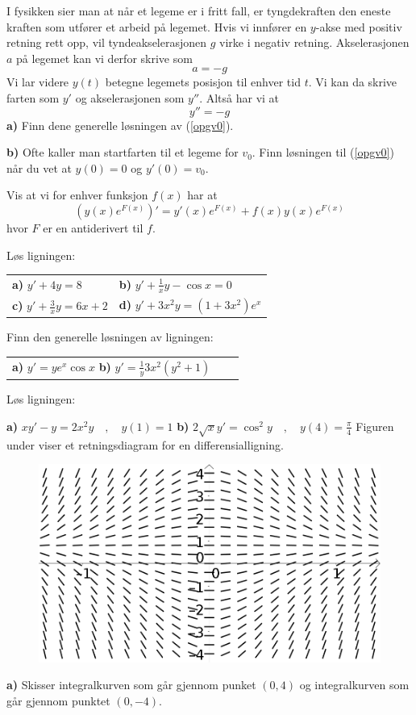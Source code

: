 



\eqlen
\opgt
\setcounter{section}{1}
I fysikken sier man at når et legeme er i fritt fall, er tyngdekraften den eneste kraften som utfører et arbeid på legemet. Hvis vi innfører en $ y $-akse med positiv retning rett opp, vil tyndeakselerasjonen $ g $ virke i negativ retning. Akselerasjonen $ a $ på legemet kan vi derfor skrive som
	\[ a = -g \]
	Vi lar videre $ y(t) $ betegne legemets posisjon til enhver tid $ t $. Vi kan da skrive farten som $ y' $ og akselerasjonen som $ y'' $. Altså har vi at
	\[ y''=-g \tag{I}\label{opgv0} \]
	\textbf{a)} Finn dene generelle løsningen av (\ref{opgv0}).\os
	
	\textbf{b)} Ofte kaller man startfarten til et legeme for $ v_0 $. Finn løsningen til (\ref{opgv0}) når du vet at $ {y(0)=0} $ og $ {y'(0)=v_0} $.
	
	\nes
	Vis at vi for enhver funksjon $ f(x) $ har at
	\[ \left(y(x) e^{F(x)}\right)' = y'(x)e^{F(x)}+f(x)y(x)e^{F(x)} \]
	hvor $ F $ er en antiderivert til $ f $.
	
	Løs ligningen:\os
	
	\begin{tabular}{@{}l l }
		\textbf{a)} $ y'+4y=8 $	\quad
		&\textbf{b)} $\displaystyle y' + \frac{1}{x}y - \cos x=0$  \\[11 pt]
		\textbf{c)} $\displaystyle y' + \frac{3}{x}y = 6x +2 $		
		&\textbf{d)} $\displaystyle y'+3x^2 y =(1+3x^2)e^x$ 
	\end{tabular}

\nes	
{}
Finn den generelle løsningen av ligningen:\os

\begin{tabular}{@{}l l l}	
	\textbf{a)} $\displaystyle y'=ye^x \cos x$\quad	
	\textbf{b)} $\displaystyle y'=\frac{1}{y}3x^2(y^2+1) $ 	
\end{tabular}

Løs ligningen:\os

\textbf{a)} $\displaystyle xy'-y=2x^2y\quad,\quad y(1)=1$\os
\textbf{b)} $2\sqrt{x}y'=\cos^2 y\quad,\quad y(4)=\frac{\pi}{4}$ 
\newpage
\nes
{}
Figuren under viser et retningsdiagram for en differensialligning.
\begin{figure}
	\centering
	\includegraphics[scale=0.85]{retn}
\end{figure}
\textbf{a)} Skisser integralkurven som går gjennom punket $ (0, 4) $ og integralkurven som går gjennom punktet $ (0, -4) $.\os

